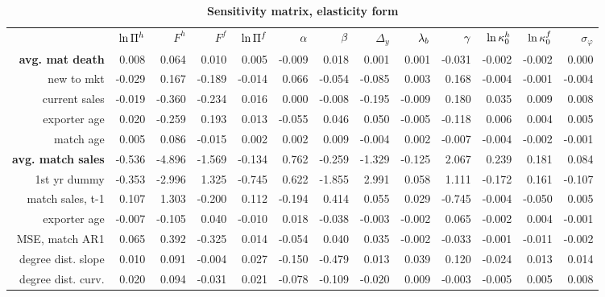 \documentclass[12pt]{article}
\begin{document}

\begin{table}[tbp]
\caption{\textbf{Sensitivity matrix, elasticity form} }
\label{tab:sensitivity_matrix_elas}%
\resizebox{\textwidth}{!} {\begin{tabular}{rrrrrrrrrrrrr}
& $\ln {\small \Pi }^{h}$ & $F^{h}$ & $F^{f}$ & $\ln {\small \Pi }^{f}$ & ${\small \alpha }$ & ${\small \beta }$ & $\Delta _{y}$ & ${\small \lambda }_{b}$ & ${\small \gamma }$ & $\ln {\small \kappa _{0}^{h}}$ & $\ln {\small \kappa _{0}^{f}}$ & $\sigma _{\varphi }$ \\ 
\textbf{avg. mat death} & 0.008 & 0.064 & 0.010 & 0.005 & -0.009 & 0.018 & 
0.001 & 0.001 & -0.031 & -0.002 & -0.002 & 0.000 \\ 
new to mkt & -0.029 & 0.167 & -0.189 & -0.014 & 0.066 & -0.054 & -0.085 & 
0.003 & 0.168 & -0.004 & -0.001 & -0.004 \\ 
current sales & -0.019 & -0.360 & -0.234 & 0.016 & 0.000 & -0.008 & -0.195 & 
-0.009 & 0.180 & 0.035 & 0.009 & 0.008 \\ 
exporter age & 0.020 & -0.259 & 0.193 & 0.013 & -0.055 & 0.046 & 0.050 & 
-0.005 & -0.118 & 0.006 & 0.004 & 0.005 \\ 
match age & 0.005 & 0.086 & -0.015 & 0.002 & 0.002 & 0.009 & -0.004 & 0.002
& -0.007 & -0.004 & -0.002 & -0.001 \\ 
\textbf{avg. match sales} & -0.536 & -4.896 & -1.569 & -0.134 & 0.762 & 
-0.259 & -1.329 & -0.125 & 2.067 & 0.239 & 0.181 & 0.084 \\ 
1st yr dummy & -0.353 & -2.996 & 1.325 & -0.745 & 0.622 & -1.855 & 2.991 & 
0.058 & 1.111 & -0.172 & 0.161 & -0.107 \\ 
match sales, t-1 & 0.107 & 1.303 & -0.200 & 0.112 & -0.194 & 0.414 & 0.055 & 
0.029 & -0.745 & -0.004 & -0.050 & 0.005 \\ 
exporter age & -0.007 & -0.105 & 0.040 & -0.010 & 0.018 & -0.038 & -0.003 & 
-0.002 & 0.065 & -0.002 & 0.004 & -0.001 \\ 
MSE, match AR1 & 0.065 & 0.392 & -0.325 & 0.014 & -0.054 & 0.040 & 0.035 & 
-0.002 & -0.033 & -0.001 & -0.011 & -0.002 \\ 
degree dist. slope & 0.010 & 0.091 & -0.004 & 0.027 & -0.150 & -0.479 & 0.013
& 0.039 & 0.120 & -0.024 & 0.013 & 0.014 \\ 
degree dist. curv. & 0.020 & 0.094 & -0.031 & 0.021 & -0.078 & -0.109 & 
-0.020 & 0.009 & -0.003 & -0.005 & 0.005 & 0.008 \\ 

\end{tabular}}
\end{table}
\end{document}
